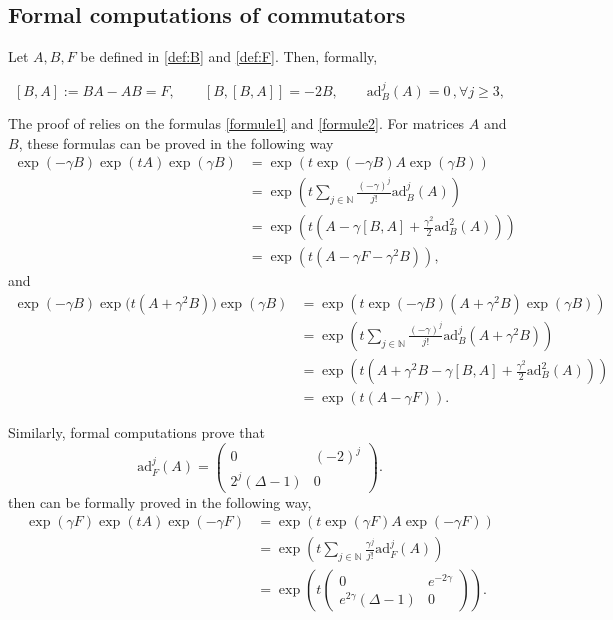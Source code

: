 \documentclass[a4paper]{article}
\theoremstyle{plain}
\begin{document}
\subsection{Formal computations of commutators} 
\label{appendix:brackets}


Let $A, B,F$ be defined in \eqref{def:B} and \eqref{def:F}. Then, formally,

$$[B,A]:=BA-AB=F, \qquad
[B,[B,A]]=-2B, \qquad
\text{ad}_{B}^j(A)=0\,, \forall j\geq 3,$$

The proof of  relies on the formulas  \eqref{formule1} and \eqref{formule2}. For matrices $A$ and $B$, these formulas can be proved in the following way
$$\begin{aligned}
  \exp(-\gamma B) \exp(t A) \exp( \gamma B)
&=\exp\left( t \exp(-\gamma B) A \exp( \gamma B) \right)
\\ &=   \exp\left( t \sum_{j\in\mathbb{N}} \frac{(-\gamma)^j}{j!} \text{ad}_B^j(A) \right)
\\
&= \exp\left( t \left( A - \gamma [B,A] + \frac{\gamma^2}{2} \text{ad}_B^2(A) \right)\right)\\
&=\exp\left( t \left(A-\gamma F -\gamma^2 B\right) \right),
\end{aligned}$$
and
$$\begin{aligned}
 \exp(-\gamma B) \exp\big(t (A+\gamma^2 B)\big) \exp( \gamma B) &= 
\exp\left( t \exp(-\gamma B) (A+\gamma^2 B) \exp( \gamma B) \right)
\\ &= 
\exp\left( t \sum_{j\in\mathbb{N}} \frac{(-\gamma)^j}{j!} \text{ad}_B^j(A+\gamma^2 B) \right)
\\
&=
\exp \left( t\left(A+\gamma^2 B - \gamma [B,A]+\frac{\gamma^2}{2} \text{ad}_B^2(A) \right)\right)
\\ &=  
\exp \left(t(A-\gamma F)\right).
\end{aligned}$$



Similarly, formal computations prove that 
$$\text{ad}_{F}^j(A)=\begin{pmatrix} 
0 & (-2)^j \\ 2^j(\Delta-1) & 0
\end{pmatrix}.$$
 then can be formally proved in the following way, 
%
$$\begin{aligned}
 \exp(\gamma F) \exp( t A) \exp(-\gamma F) &= 
\exp \left( t \exp(\gamma F) A \exp(-\gamma F) \right) \\&
=
\exp \left( t \sum_{j\in\mathbb{N}} \frac{\gamma^j}{j!} \text{ad}_F^j(A) \right) 
\\ &= 
\exp \left( t 
\begin{pmatrix} 
0 & e^{-2\gamma} \\ e^{2\gamma}(\Delta-1) & 0
\end{pmatrix} \right).
\end{aligned}$$
\end{document}
